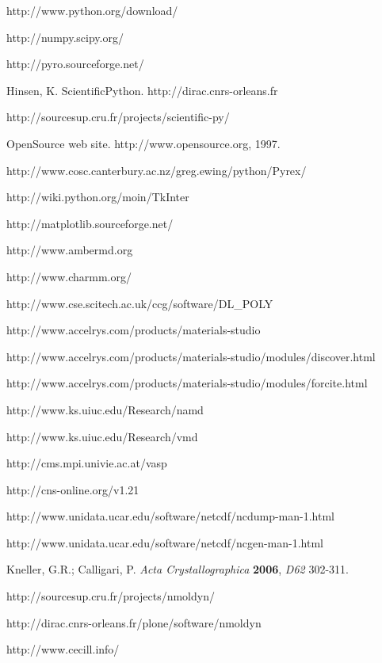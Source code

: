\documentclass[a4paper,11pt]{report}
\begin{document}
\begin{thebibliography}{99}
 http://www.python.org/download/

 http://numpy.scipy.org/

 http://pyro.sourceforge.net/

 Hinsen, K. ScientificPython. http://dirac.cnrs-orleans.fr  

 http://sourcesup.cru.fr/projects/scientific-py/

 OpenSource web site. http://www.opensource.org, 1997.

 http://www.cosc.canterbury.ac.nz/greg.ewing/python/Pyrex/

 http://wiki.python.org/moin/TkInter

 http://matplotlib.sourceforge.net/

 http://www.ambermd.org

 http://www.charmm.org/

 http://www.cse.scitech.ac.uk/ccg/software/DL\_POLY

 http://www.accelrys.com/products/materials-studio

 http://www.accelrys.com/products/materials-studio/modules/discover.html

 http://www.accelrys.com/products/materials-studio/modules/forcite.html

 http://www.ks.uiuc.edu/Research/namd

 http://www.ks.uiuc.edu/Research/vmd

 http://cms.mpi.univie.ac.at/vasp

 http://cns-online.org/v1.21

 http://www.unidata.ucar.edu/software/netcdf/ncdump-man-1.html

 http://www.unidata.ucar.edu/software/netcdf/ncgen-man-1.html

 Kneller, G.R.; Calligari, P. \textit{Acta Crystallographica} \textbf{2006}, \textit{D62} 302-311.

 http://sourcesup.cru.fr/projects/nmoldyn/

 http://dirac.cnrs-orleans.fr/plone/software/nmoldyn

 http://www.cecill.info/


\end{thebibliography}
\end{document}

